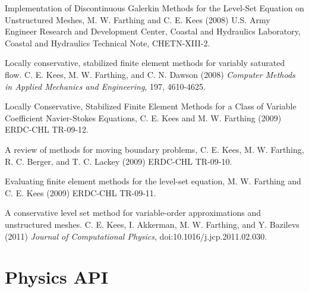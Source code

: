 \documentclass{beamer}
\begin{document}
\begin{frame}
\end{frame}

\begin{frame}
\end{frame}

\begin{frame}
\bit
\footnotesize
\item Implementation of Discontinuous Galerkin Methods for the
  Level-Set Equation on Unstructured Meshes, M. W. Farthing and C. E.
  Kees (2008) U.S. Army Engineer Research and Development Center,
  Coastal and Hydraulics Laboratory, Coastal and Hydraulics Technical
  Note, CHETN-XIII-2.

\item Locally conservative, stabilized finite element methods for
  variably saturated flow. C. E. Kees, M. W. Farthing, and C. N.
  Dawson (2008) {\em Computer Methods in Applied Mechanics and
    Engineering}, 197, 4610-4625.

\item Locally Conservative, Stabilized Finite Element Methods for a
  Class of Variable Coefficient Navier-Stokes Equations, C. E. Kees
  and M. W. Farthing (2009) ERDC-CHL TR-09-12.

\item A review of methods for moving boundary problems, C. E. Kees,
  M. W. Farthing, R. C. Berger, and T. C. Lackey (2009) ERDC-CHL
  TR-09-10.

\item Evaluating finite element methods for the level-set equation,
  M. W. Farthing and C. E. Kees (2009) ERDC-CHL TR-09-11.

\item A conservative level set method for variable-order
  approximations and unstructured meshes. C. E. Kees, I. Akkerman,
  M. W. Farthing, and Y. Bazilevs (2011) {\em Journal of Computational
    Physics}, doi:10.1016/j.jcp.2011.02.030.
\eit
\end{frame}

\section{Physics API}
\end{document}
